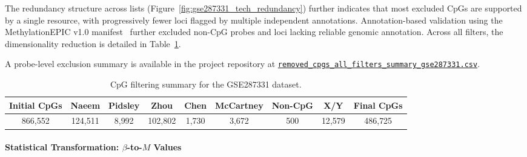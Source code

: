 The redundancy structure across lists (Figure~\ref{fig:gse287331_tech_redundancy}) further indicates that most excluded CpGs are supported by a single resource, with progressively fewer loci flagged by multiple independent annotations.
Annotation-based validation using the MethylationEPIC v1.0 manifest~\cite{IlluminaEPIC} further excluded non-CpG probes and loci lacking reliable genomic annotation. 
Across all filters, the dimensionality reduction is detailed in Table~\ref{tab:gse287331_cpg_filtering}.

A probe-level exclusion summary is available in the project repository at  
\href{https://github.com/elisabettaroviera/THESIS/blob/main/05%20-%20CpG%20list/Removed%20CpGs%20per%20Dataset/removed_cpgs_all_filters_summary_gse287331.csv}
{\texttt{removed\_cpgs\_all\_filters\_summary\_gse287331.csv}}.

\begin{table}[t]
\centering
\caption{CpG filtering summary for the GSE287331 dataset.}
\label{tab:gse287331_cpg_filtering}
\scriptsize
\begin{tabular}{c c c c c c c c c}
\toprule
Initial CpGs &
Naeem &
Pidsley &
Zhou &
Chen &
McCartney &
Non-CpG &
X/Y &
Final CpGs \\
\midrule
866{,}552 &
124{,}511 &
8{,}992 &
102{,}802 &
1{,}730 &
3{,}672 &
500 &
12{,}579 &
486{,}725 \\
\bottomrule
\end{tabular}
\end{table}


\paragraph{Statistical Transformation: $\beta$-to-$M$ Values}
\label{par:gse287331_step4}


